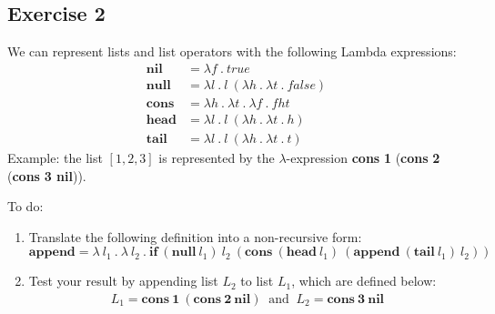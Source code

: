 \documentclass [11pt, a4wide, twoside]{article}
\begin{document}
\subsection*{Exercise 2}

We can represent lists and list operators with the following Lambda expressions:
%
\begin{align*}
	\textbf{nil} & = \lambda f~.~true\\
	\textbf{null} & = \lambda l~.~l~(\lambda h~.~\lambda t~.~false)\\
	\textbf{cons} & = \lambda h~.~\lambda t~.~\lambda f~.~f h t\\
	\textbf{head} & = \lambda l~.~l~( \lambda h~.~ \lambda t~.~h)\\
	\textbf{tail} & = \lambda l~.~l~( \lambda h~.~ \lambda t~.~t)
\end{align*}
%
Example: the list $[1,2,3]$ is represented by the $\lambda$-expression \textbf{cons} \textbf{1} (\textbf{cons} \textbf{2} (\textbf{cons} \textbf{3 nil})).\pagebreak

\noindent To do:
%
\begin{enumerate}
\item Translate the following definition into a non-recursive form:
	\begin{equation*}
	\textbf{append} = \lambda~ l_{1} ~.~ \lambda~ l_{2} ~.~\textbf{if}~ (\textbf{null}~ l_{1}) ~l_{2} ~(\textbf{cons} ~(\textbf{head} ~l_{1}) ~ (\textbf{append}~ (\textbf{tail} ~ l_{1}) ~ l_{2}))
	\end{equation*}
\item Test your result by appending list $L_2$ to list $L_1$, which are defined below:
	\begin{align*}
	L_{1}  = \textbf{cons}~\textbf{1} ~(\textbf{cons} ~\textbf{2} ~\textbf{nil})~ \text{ and } ~ L_{2} = \textbf{cons}~ \textbf{3} ~\textbf{nil}\\
	\end{align*}
\end{enumerate}
%

\end{document}
